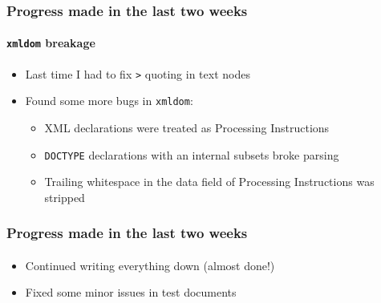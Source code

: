 \documentclass[
    alternativetitlepage=alternativ,
    cornerlogo=hgi_nds_logo2,
    sectionoverview,
]{rubpresentation}
\begin{document}
\begin{frame}[fragile]
    \frametitle{Progress made in the last two weeks}
    \framesubtitle{\texttt{xmldom} breakage}
    \begin{itemize}
        \item{} Last time I had to fix \texttt{>} quoting in text nodes
        \item{} Found some more bugs in \texttt{xmldom}:
        \begin{itemize}
            \item{} XML declarations were treated as Processing Instructions
            \item{} \texttt{DOCTYPE} declarations with an internal subsets broke parsing
            \item{} Trailing whitespace in the data field of Processing Instructions was stripped
        \end{itemize}
    \end{itemize}
\end{frame}

\begin{frame}
    \frametitle{Progress made in the last two weeks}
    \framesubtitle{}
    \begin{itemize}
        \item{} Continued writing everything down (almost done!)
        \item{} Fixed some minor issues in test documents
    \end{itemize}
\end{frame}
\end{document}
